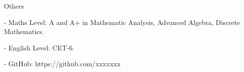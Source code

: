 \documentclass{resume} %
\begin{document}

\begin{rSection}{Others}
\begin{rSubsection}
{}{}{}{}
\item[-] Maths Level: A and A+ in Mathematic Analysis, Advanced Algebra, Discrete Mathematics.
\item[-] English Level: CET-6.
\item[-] GitHub: https://github.com/xxxxxxx
\end{rSubsection}
\end{rSection}
\end{document}
